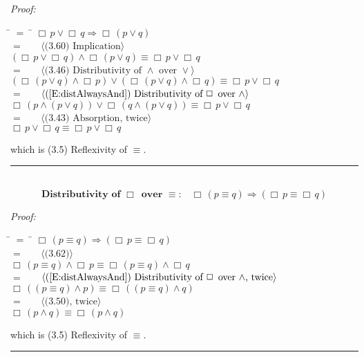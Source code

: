 \documentclass[fleqn, leqno]{article}
\newcommand{\lgap}{2pt} %
\newcommand{\mymathindent}{24pt} %
\newcommand{\Always}{\Box\,}
\newcommand{\myqed}{\hfill\rule[-.23ex]{1.2ex}{2.0ex}}
\newcommand{\Gll} {\langle} %
\newcommand{\Ggg} {\rangle} %
\newcommand{\Hint}[1] {\ \ \ $\Gll \mbox{#1} \Ggg$ } %
\begin{document}
\emph{Proof:}
\begin{tabbing}
\hspace{\mymathindent} \= $= \;$ \= \kill
\> \> $\Always p \lor \Always q \Rightarrow \Always(p \lor q)$\\[\lgap]
\> $=$ \> \Hint{(3.60) Implication}\\[\lgap]
\> \> $(\Always p \lor \Always q) \land \Always(p \lor q) \equiv \Always p \lor \Always q$\\[\lgap]
\> $=$ \> \Hint{(3.46) Distributivity of $\land$ over $\lor$}\\[\lgap]
\> \> $(\Always (p \lor q) \land \Always p) \lor (\Always (p \lor q) \land \Always q) \equiv \Always p \lor \Always q$\\[\lgap]
\> $=$ \> \Hint{(\ref{E:distAlwaysAnd}) Distributivity of $\Always$ over $\land$}\\[\lgap]
\> \> $\Always(p \land (p \lor q)) \lor \Always(q \land (p \lor q)) \equiv \Always p \lor \Always q$\\[\lgap]
\> $=$ \> \Hint{(3.43) Absorption, twice}\\[\lgap]
\> \> $\Always p \lor \Always q \equiv \Always p \lor \Always q$\\[\lgap]
\end{tabbing}
which is (3.5) Reflexivity of $\equiv$. \myqed\\[\lgap]


\begin{equation}\label{E:distAlwaysEquiv}
\textbf{Distributivity of $\Always$ over $\equiv$:}\quad \Always (p \equiv q) \Rightarrow (\Always p \equiv \Always q)
\end{equation}

\emph{Proof:}
\begin{tabbing}
\hspace{\mymathindent} \= $= \;$ \= \kill
\> \> $\Always (p \equiv q) \Rightarrow (\Always p \equiv \Always q)$\\[\lgap]
\> $=$ \> \Hint{(3.62)}\\[\lgap]
\> \> $\Always (p \equiv q) \land \Always p \equiv \Always (p \equiv q) \land \Always q$\\[\lgap]
\> $=$ \> \Hint{(\ref{E:distAlwaysAnd}) Distributivity of $\Always$ over $\land$, twice}\\[\lgap]
\> \> $\Always((p \equiv q) \land p) \equiv \Always((p \equiv q) \land q)$\\[\lgap]
\> $=$ \> \Hint{(3.50), twice}\\[\lgap]
\> \> $\Always(p \land q) \equiv \Always (p \land q)$\\[\lgap]
\end{tabbing}
which is (3.5) Reflexivity of $\equiv$. \myqed\\[\lgap]
\end{document}
